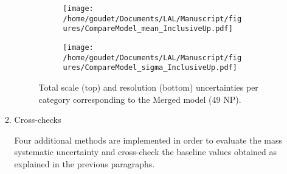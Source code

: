 \begin{enumerate}
\begin{enumerate}
\begin{figure}
\begin{subfigure}[t]{\linewidth}
\begin{center}
\texttt{[image: /home/goudet/Documents/LAL/Manuscript/figures/CompareModel\_mean\_InclusiveUp.pdf]}
\end{center}
\end{subfigure}
\begin{subfigure}[t]{\linewidth}
\begin{center}
\texttt{[image: /home/goudet/Documents/LAL/Manuscript/figures/CompareModel\_sigma\_InclusiveUp.pdf]}
\end{center}
\end{subfigure}
\caption{\label{org0ea9f20}
Total scale (top) and resolution (bottom) uncertainties per category corresponding to the Merged model (49 NP).}
\end{figure}



\item Cross-checks
\label{sec:org44c935f}

Four additional methods are implemented in order to evaluate the mass systematic uncertainty and cross-check the baseline values obtained as explained in the previous paragraphs.



\end{enumerate}
\end{enumerate}
